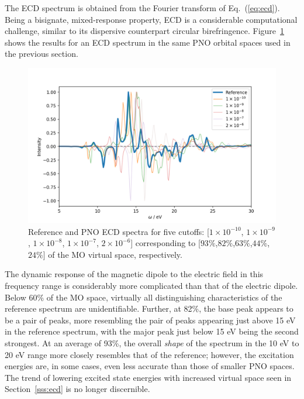 The ECD spectrum is obtained from the Fourier transform of Eq.~(\ref{eq:ecd}).
Being a bisignate, mixed-response property, ECD is a considerable computational
challenge, similar to its dispersive counterpart circular birefringence. 
Figure~\ref{fig:pno_ecd} shows the results for an ECD spectrum in the same PNO 
orbital spaces used in the previous section.
\begin{figure} 
    \centering
    \includegraphics[scale=.6]{p3/figures/pno_ecd.png}
    \caption{Reference and PNO ECD spectra for five cutoffs: 
    [$1\times 10^{-10}$, $1\times 10^{-9}$, $1\times 10^{-8}$, $1\times 10^{-7}$, 
    $2\times 10^{-6}$] corresponding to [$93\%$,$82\%$,$63\%$,$44\%$,$24\%$]
    of the MO virtual space, respectively.}
    \label{fig:pno_ecd}
\end{figure}
The dynamic response of the magnetic dipole to the electric field in this frequency 
range is considerably more complicated than that of the electric dipole. Below 60\% of
the MO space, virtually all distinguishing characteristics of the reference 
spectrum are unidentifiable. Further, at 82\%, the base peak appears to be a pair of 
peaks, more resembling the pair of peaks appearing just above 15 eV in the 
reference spectrum, with the major peak just below 15 eV being the second strongest.
At an average of 93\%, the overall \textit{shape} of the spectrum in the 10 eV to 
20 eV range more closely resembles that of the reference; however, the excitation
energies are, in some cases, even less accurate than those of smaller PNO spaces.
The trend of lowering excited state energies with increased virtual space seen in 
Section~\ref{sss:ecd} is no longer discernible. 

